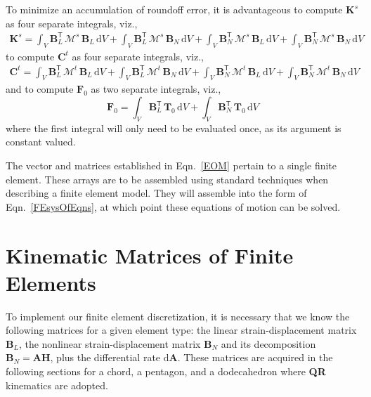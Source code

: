 To minimize an accumulation of roundoff error, it is advantageous to compute $\mathbf{K}^s$ as four separate integrals, viz.,
\begin{multline*}
\mathbf{K}^s = \int_V \mathbf{B}_L^{\mathsf{T}} \, 
\boldsymbol{\mathcal{M}}^s \, \mathbf{B}_L \, \mathrm{d}V + 
\int_V \mathbf{B}_L^{\mathsf{T}} \, \boldsymbol{\mathcal{M}}^s \, 
\mathbf{B}_N \, \mathrm{d}V + 
\int_V \mathbf{B}_N^{\mathsf{T}} \, \boldsymbol{\mathcal{M}}^s \, 
\mathbf{B}_L \, \mathrm{d}V + 
\int_V \mathbf{B}_N^{\mathsf{T}} \, \boldsymbol{\mathcal{M}}^s \, 
\mathbf{B}_N \, \mathrm{d}V
\end{multline*}
to compute $\mathbf{C}^t$ as four separate integrals, viz.,
\begin{multline*}
\mathbf{C}^t = \int_V \mathbf{B}_L^{\mathsf{T}} \, 
\boldsymbol{\mathcal{M}}^t \, \mathbf{B}_L \, \mathrm{d}V + 
\int_V \mathbf{B}_L^{\mathsf{T}} \, \boldsymbol{\mathcal{M}}^t \, 
\mathbf{B}_N \, \mathrm{d}V + 
\int_V \mathbf{B}_N^{\mathsf{T}} \, \boldsymbol{\mathcal{M}}^t \, 
\mathbf{B}_L \, \mathrm{d}V + 
\int_V \mathbf{B}_N^{\mathsf{T}} \, \boldsymbol{\mathcal{M}}^t \, 
\mathbf{B}_N \, \mathrm{d}V
\end{multline*}
and to compute $\boldsymbol{F}_0$ as two separate integrals, viz.,
\begin{equation*}
    \boldsymbol{F}_0 = \int_V \mathbf{B}_L^{\mathsf{T}} \, 
        \boldsymbol{T}_0 \, \mathrm{d}V + 
        \int_V \mathbf{B}_N^{\mathsf{T}} \, 
        \boldsymbol{T}_0 \, \mathrm{d}V 
\end{equation*}
where the first integral will only need to be evaluated once, as its argument is constant valued.

The vector and matrices established in Eqn.~\eqref{EOM} pertain to a single finite element.  These arrays are to be assembled using standard techniques \cite{ClaytonChung18} when describing a finite element model.  They will assemble into the form of Eqn.~\eqref{FEsysOfEqns}, at which point these equations of motion can be solved.


\section{Kinematic Matrices of Finite Elements}

To implement our finite element discretization, it is necessary that we know the following matrices for a given element type: the linear strain-displacement matrix $\mathbf{B}_L$, the nonlinear strain-displacement matrix $\mathbf{B}_N$ and its decomposition $\mathbf{B}_N = \mathbf{AH}$, plus the differential rate $\mathrm{d}\mathbf{A}$.  These matrices are acquired in the following sections for a chord, a pentagon, and a dodecahedron where \textbf{QR} kinematics are adopted.

